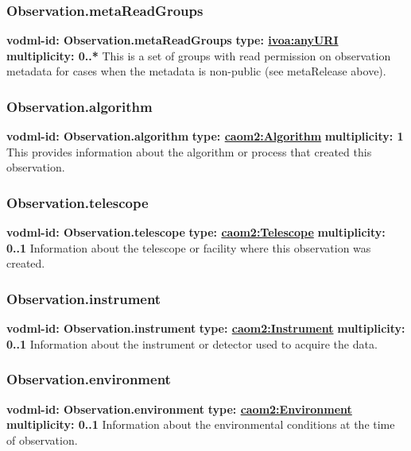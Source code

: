     \subsubsection{Observation.metaReadGroups}
      \textbf{vodml-id: Observation.metaReadGroups} \newline
      \textbf{type: \hyperref[sect:ivoa]{ivoa:anyURI}} \newline
      \textbf{multiplicity: 0..*} \newline
      This is a set of groups with read permission on observation metadata for cases when the metadata is non-public (see metaRelease above).

    \subsubsection{Observation.algorithm}
      \textbf{vodml-id: Observation.algorithm} \newline
      \textbf{type: \hyperref[sect:Algorithm]{caom2:Algorithm}} \newline
      \textbf{multiplicity: 1} \newline
      This provides information about the algorithm or process that created this observation.

    \subsubsection{Observation.telescope}
      \textbf{vodml-id: Observation.telescope} \newline
      \textbf{type: \hyperref[sect:Telescope]{caom2:Telescope}} \newline
      \textbf{multiplicity: 0..1} \newline
      Information about the telescope or facility where this observation was created.

    \subsubsection{Observation.instrument}
      \textbf{vodml-id: Observation.instrument} \newline
      \textbf{type: \hyperref[sect:Instrument]{caom2:Instrument}} \newline
      \textbf{multiplicity: 0..1} \newline
      Information about the instrument or detector used to acquire the data.

    \subsubsection{Observation.environment}
      \textbf{vodml-id: Observation.environment} \newline
      \textbf{type: \hyperref[sect:Environment]{caom2:Environment}} \newline
      \textbf{multiplicity: 0..1} \newline
      Information about the environmental conditions at the time of observation.

